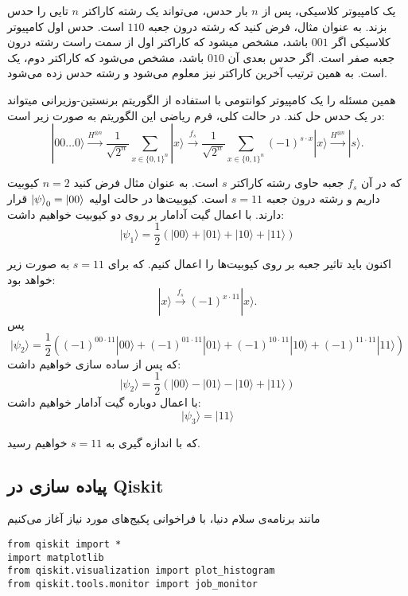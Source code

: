 \documentclass[a4paper,11pt,oneside,openany]{iut-thesis}
\begin{document}
یک کامپیوتر کلاسیکی، پس از $n$  بار حدس، می‌تواند یک رشته کاراکتر $n$ تایی را حدس بزند. به عنوان مثال، فرض کنید که رشته درون جعبه $110$ است. حدس اول کامپیوتر کلاسیکی اگر $001$ باشد،  مشخص میشود که کاراکتر اول از سمت راست رشته درون جعبه صفر است. اگر حدس بعدی آن $010$ باشد، مشخص می‌شود که کاراکتر دوم، یک است. به همین ترتیب آخرین کاراکتر نیز معلوم می‌شود و رشته حدس زده می‌شود.

همین مسئله را یک کامپیوتر کوانتومی با استفاده از الگوریتم برنستین-وزیرانی میتواند در یک حدس حل کند. 
در حالت کلی، فرم ریاضی این الگوریتم به صورت زیر است:
\begin{equation}
|00\dots 0\rangle \xrightarrow{H^{\otimes n}} \frac{1}{\sqrt{2^n}} \sum_{x\in \{0,1\}^n} |x\rangle \xrightarrow{f_s} \frac{1}{\sqrt{2^n}} \sum_{x\in \{0,1\}^n} (-1)^{s\cdot x}|x\rangle \xrightarrow{H^{\otimes n}} |s\rangle .
\end{equation}

که در آن $f_s$ جعبه حاوی رشته کاراکتر $s$ است. به عنوان مثال فرض کنید $n=2$  کیوبیت داریم و رشته درون جعبه $s=11$  است. کیوبیت‌ها در حالت اولیه $ \ket \psi_{0} = \ket{00} $ قرار دارند. با اعمال گیت آدامار بر روی دو کیوبیت خواهیم داشت:
\begin{equation}
\lvert \psi_1 \rangle = \frac{1}{2} \left( \lvert 0 0 \rangle + \lvert 0 1 \rangle + \lvert 1 0 \rangle + \lvert 1 1 \rangle \right) 
\end{equation}


اکنون باید تاثیر جعبه بر روی کیوبیت‌ها را اعمال کنیم. که برای $s=11$ به صورت زیر خواهد بود:
\begin{equation}
|x \rangle \xrightarrow{f_s} (-1)^{x\cdot 11} |x \rangle.
\end{equation}
 پس 
\begin{equation}
\lvert \psi_2 \rangle = \frac{1}{2} \left( (-1)^{00\cdot 11}|00\rangle + (-1)^{01\cdot 11}|01\rangle + (-1)^{10\cdot 11}|10\rangle + (-1)^{11\cdot 11}|11\rangle \right)
\end{equation}
که پس از ساده سازی خواهیم داشت:
\begin{equation}
\lvert \psi_2 \rangle = \frac{1}{2} \left( \lvert 0 0 \rangle - \lvert 0 1 \rangle - \lvert 1 0 \rangle + \lvert 1 1 \rangle \right)
\end{equation}
با اعمال دوباره گیت آدامار خواهیم داشت:
\begin{equation}
\lvert \psi_3 \rangle = \lvert 1 1 \rangle
\end{equation}

که با اندازه گیری به $s=11$ خواهیم رسید.
\subsection{
پیاده سازی در Qiskit
}
مانند برنامه‌ی سلام دنیا، با فراخوانی پکیج‌های مورد نیاز آغاز می‌کنیم
\begin{latin}
\begin{lstlisting}[style=Mypython]
from qiskit import * 
import matplotlib
from qiskit.visualization import plot_histogram
from qiskit.tools.monitor import job_monitor
\end{lstlisting}
\end{latin}
\end{document}
